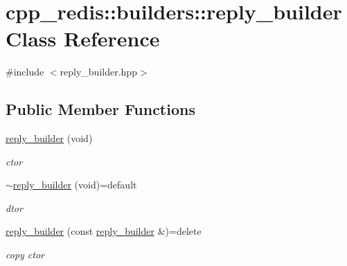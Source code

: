 \hypertarget{classcpp__redis_1_1builders_1_1reply__builder}{}\section{cpp\+\_\+redis\+:\+:builders\+:\+:reply\+\_\+builder Class Reference}
\label{classcpp__redis_1_1builders_1_1reply__builder}


{\ttfamily \#include $<$reply\+\_\+builder.\+hpp$>$}

\subsection*{Public Member Functions}
\begin{DoxyCompactItemize}
\item 
\mbox{\label{classcpp__redis_1_1builders_1_1reply__builder_accbe07b853ad26338abf18f7975f616f}} 
\mbox{\hyperlink{classcpp__redis_1_1builders_1_1reply__builder_accbe07b853ad26338abf18f7975f616f}{reply\+\_\+builder}} (void)
\begin{DoxyCompactList}\small\item\em ctor \end{DoxyCompactList}\item 
\mbox{\label{classcpp__redis_1_1builders_1_1reply__builder_ac2df7e1ed2f67e01090ad45926c9af1e}} 
\mbox{\hyperlink{classcpp__redis_1_1builders_1_1reply__builder_ac2df7e1ed2f67e01090ad45926c9af1e}{$\sim$reply\+\_\+builder}} (void)=default
\begin{DoxyCompactList}\small\item\em dtor \end{DoxyCompactList}\item 
\mbox{\label{classcpp__redis_1_1builders_1_1reply__builder_acfffbe0b66c7f9da0f1772b2b7fbdc17}} 
\mbox{\hyperlink{classcpp__redis_1_1builders_1_1reply__builder_acfffbe0b66c7f9da0f1772b2b7fbdc17}{reply\+\_\+builder}} (const \mbox{\hyperlink{classcpp__redis_1_1builders_1_1reply__builder}{reply\+\_\+builder}} \&)=delete
\begin{DoxyCompactList}\small\item\em copy ctor \end{DoxyCompactList}\item 

\end{DoxyCompactItemize}
